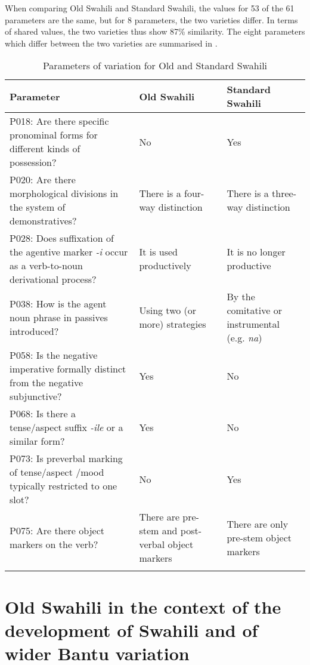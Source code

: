 \documentclass[output=paper]{langscibook}
\begin{document}
When comparing Old Swahili and Standard Swahili, the values for 53 of the 61 parameters are the same, but for 8 parameters, the two varieties differ. In terms of shared values, the two varieties thus show 87\% similarity. The eight parameters which differ between the two varieties are summarised in . 

\begin{table}[t]
\small
\begin{tabularx}{\textwidth}{>{\raggedright\arraybackslash}p{}QQ}
\lsptoprule
{Parameter} & {Old Swahili} & {Standard Swahili}\\
\midrule
P018: Are there specific pronominal forms for different kinds of possession? & No & Yes \\
\tablevspace
P020: Are there morphological divisions in the system of demonstratives? & There is a four-way distinction & There is a three-way distinction \\
\tablevspace
P028: Does suffixation of the agentive marker \textit{{}-i} occur as a verb-to-noun derivational process? & It is used productively & It is no longer productive \\
\tablevspace
P038: How is the agent noun phrase in passives introduced? & Using two (or more) strategies & By the comitative or instrumental (e.g. \textit{na})\\
\tablevspace
P058: Is the negative imperative formally distinct from the negative subjunctive? & Yes & No\\
\tablevspace
P068: Is there a tense/aspect suffix \textit{{}-ile} or a similar form? & Yes & No \\
\tablevspace
P073: Is preverbal marking of tense/aspect /mood typically restricted to one slot? & No & Yes \\
\tablevspace
P075: Are there object markers on the verb? & There are pre-stem and post-verbal object markers & There are only pre-stem object markers \\
\lspbottomrule
\end{tabularx}
\caption{\label{tab:marten:5} Parameters of variation for Old and Standard Swahili}
\end{table}

\section{Old Swahili in the context of the development of Swahili and of wider Bantu variation}\label{sec:marten:4}
\end{document}
